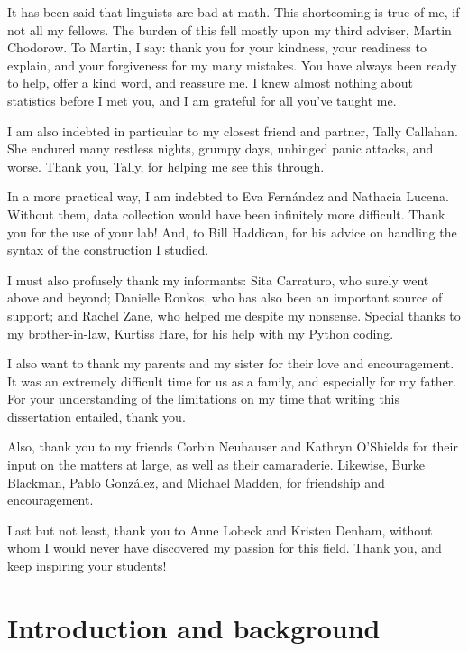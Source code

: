 \documentclass[11pt,oneside]{book}
\begin{document}
It has been said that linguists are bad at math. This shortcoming is true of me, if not all my fellows. The burden of this fell mostly upon my third adviser, Martin Chodorow. To Martin, I say: thank you for your kindness, your readiness to explain, and your forgiveness for my many mistakes. You have always been ready to help, offer a kind word, and reassure me. I knew almost nothing about statistics before I met you, and I am grateful for all you've taught me.

I am also indebted in particular to my closest friend and partner, Tally Callahan. She endured many restless nights, grumpy days, unhinged panic attacks, and worse. Thank you, Tally, for helping me see this through.

In a more practical way, I am indebted to Eva Fern\'{a}ndez and Nathacia Lucena. Without them, data collection would have been infinitely more difficult. Thank you for the use of your lab! And, to Bill Haddican, for his advice on handling the syntax of the construction I studied. 

I must also profusely thank my informants: Sita Carraturo, who surely went above and beyond; Danielle Ronkos, who has also been an important source of support; and Rachel Zane, who helped me despite my nonsense. Special thanks to my brother-in-law, Kurtiss Hare, for his help with my Python coding.

I also want to thank my parents and my sister for their love and encouragement. It was an extremely difficult time for us as a family, and especially for my father. For your understanding of the limitations on my time that writing this dissertation entailed, thank you. 

Also, thank you to my friends Corbin Neuhauser and Kathryn O’Shields for their input on the matters at large, as well as their camaraderie. Likewise, Burke Blackman, Pablo Gonz\'{a}lez, and Michael Madden, for friendship and encouragement.

Last but not least, thank you to Anne Lobeck and Kristen Denham, without whom I would never have discovered my passion for this field. Thank you, and keep inspiring your students!

\pagebreak

{
\setcounter{tocdepth}{1}
\tableofcontents
}
\listoftables
\listoffigures
\pagebreak

\setlength\parindent{24pt}\setlength{\parskip}{0.0pt plus 1.0pt}


\hypertarget{introduction-and-background}{%
\chapter{Introduction and background}\label{introduction-and-background}}
\end{document}
